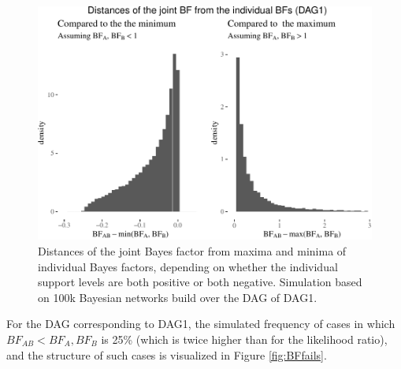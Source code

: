 \documentclass[
  10pt,
  dvipsnames,enabledeprecatedfontcommands]{scrartcl}
\begin{document}
\begin{figure}

\begin{center}\includegraphics[width=1\linewidth]{conjunction-appendix12_files/figure-latex/BFind-1} \end{center}
\caption{Distances of the joint Bayes factor from maxima and minima of individual Bayes factors, depending on whether the individual support levels are both positive or both negative. Simulation based on 100k Bayesian networks build over the DAG of \textsf{DAG1}.}
\label{fig:DAG1BF}
\end{figure}

For the DAG corresponding to \textsf{DAG1}, the simulated frequency of
cases in which \(BF_{AB} < BF_{A}, BF_{B}\) is 25\% (which is twice
higher than for the likelihood ratio), and the structure of such cases
is visualized in Figure \ref{fig:BFfails}.
\end{document}
